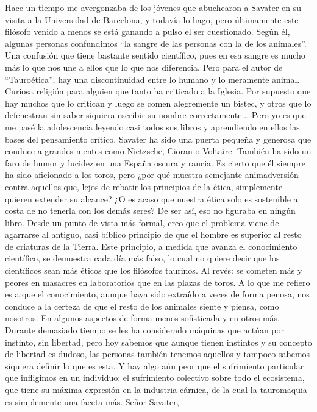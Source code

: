 \documentclass[a4paper,11pt,openright,twocolumn]{book}
\begin{document}
Hace un tiempo me avergonzaba de los jóvenes que abuchearon a Savater en su visita a la Universidad
de Barcelona, y todavía lo hago, pero últimamente este filósofo venido a menos se está ganando a pulso
el ser cuestionado. Según él, algunas personas confundimos ``la sangre de las personas con la de los 
animales''. Una confusión que tiene bastante sentido científico, pues en esa sangre es mucho más lo que nos une a ellos
que lo que nos diferencia. Pero para el autor de ``Tauroética'', hay una discontinuidad entre lo humano y lo meramente
animal. Curiosa religión para alguien que tanto ha criticado a la Iglesia. Por supuesto que hay muchos que
lo critican y luego se comen alegremente un bistec, y otros que lo defenestran sin saber siquiera escribir
su nombre correctamente... Pero yo es que me pasé la adolescencia leyendo casi todos sus libros y aprendiendo
en ellos las bases del pensamiento crítico. Savater ha sido una puerta pequeña y generosa que conduce 
a grandes mentes como Nietzsche, Cioran o Voltaire. También ha sido un faro de humor y lucidez en una España oscura
y rancia. Es cierto que él siempre ha sido aficionado a los toros, pero ¿por qué muestra semejante animadversión 
contra aquellos que, lejos de rebatir los principios de la ética, simplemente quieren extender su alcance? 
¿O es acaso que nuestra ética solo es sostenible a costa de no tenerla con los demás seres? De ser así, eso no figuraba
en ningún libro. Desde un punto de vista más formal, creo que el problema viene de agarrarse al antiguo, casi bíblico
principio de que el hombre es superior al resto de criaturas de la Tierra. Este principio, a medida que avanza
el conocimiento científico, se demuestra cada día más falso, lo cual no quiere decir que los científicos sean más
éticos que los filósofos taurinos. Al revés: se cometen más y peores en masacres en laboratorios que en las plazas de toros.
A lo que me refiero es a que el conocimiento, aunque haya sido extraído a veces de forma penosa, nos conduce a la
certeza de que el resto de los animales siente y piensa, como nosotros. En algunos aspectos de forma menos sofisticada y en otros
más. Durante demasiado tiempo se les ha considerado
máquinas que actúan por instinto, sin libertad, pero hoy sabemos que aunque tienen instintos y su concepto de libertad
es dudoso, las personas también tenemos aquellos y tampoco sabemos siquiera definir lo que es esta. Y hay algo aún peor que
el sufrimiento particular que infligimos en un individuo: el sufrimiento colectivo sobre todo el ecosistema, que tiene
su máxima expresión en la industria cárnica, de la cual la tauromaquia es simplemente una faceta más. Señor Savater,
\end{document}

